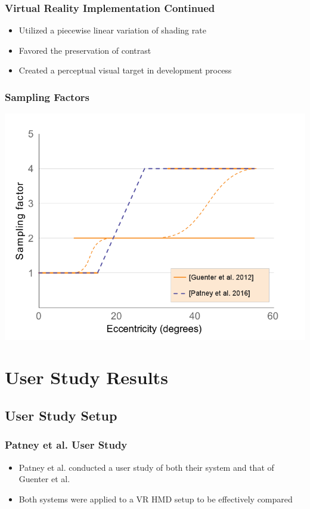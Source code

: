 \documentclass{beamer}
\newcommand{\linespace}{\vskip 0.25cm}
\begin{document}
\begin{frame}
  \frametitle{Virtual Reality Implementation Continued}
	\begin{itemize}
		
		\item Utilized a piecewise linear variation of shading rate
		\linespace
		\item Favored the preservation of contrast 
		\linespace
		\item Created a perceptual visual target in development process	

	\end{itemize}
\end{frame}

\begin{frame}
  \frametitle{Sampling Factors}
  
  	\begin{center}
    		\includegraphics[width=.65\textwidth]{Illustrations/sampling_eccentricity_Patney2.png}
  	\end{center}
  
\end{frame}


\section[Results]{User Study Results}



\subsection{User Study Setup}

\begin{frame}
  \frametitle{Patney et al. User Study}
	\begin{itemize}
		\item Patney et al. conducted a user study of both their system and that of Guenter et al.
\linespace		
		\item Both systems were applied to a VR HMD setup to be effectively compared
	\end{itemize}
\end{frame}
\end{document}
